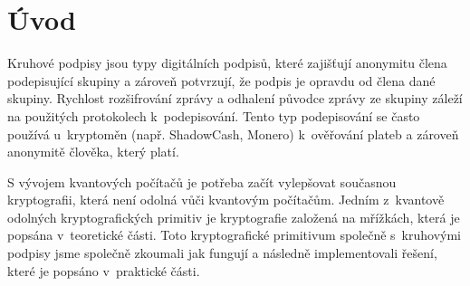 \chapter*{Úvod}
{}

Kruhové podpisy jsou typy digitálních podpisů, které zajišťují anonymitu člena podepisující skupiny a zároveň potvrzují, že podpis je opravdu od člena dané skupiny. Rychlost rozšifrování zprávy a odhalení původce zprávy ze skupiny záleží na použitých protokolech k~podepisování. Tento typ podepisování se často používá u~kryptoměn (např. ShadowCash, Monero) k~ověřování plateb a zároveň anonymitě člověka, který platí.

S vývojem kvantových počítačů je potřeba začít vylepšovat současnou kryptografii, která není odolná vůči kvantovým počítačům. Jedním z~kvantově odolných kryptografických primitiv je kryptografie založená na mřížkách, která je popsána v~teoretické části. Toto kryptografické primitivum společně s~kruhovými podpisy jsme společně zkoumali jak fungují a následně implementovali řešení, které je popsáno v~praktické části.
